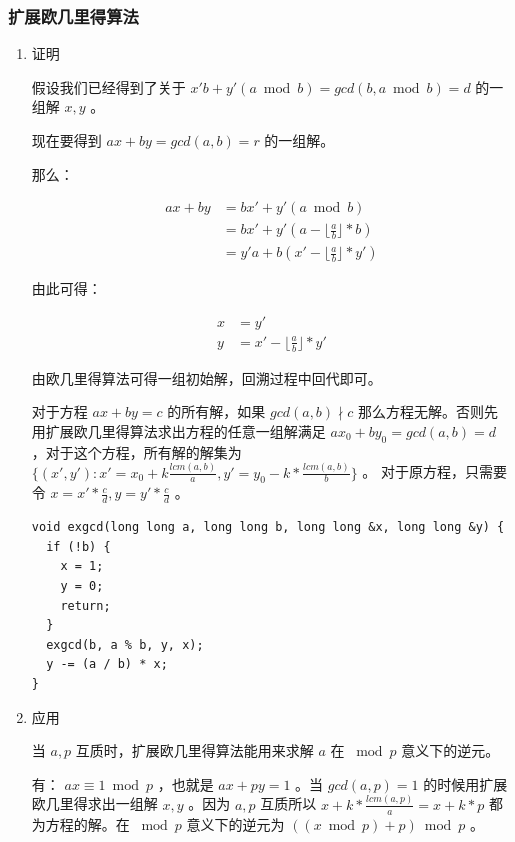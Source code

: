 \documentclass[11pt]{article}
\begin{document}
\subsubsection{扩展欧几里得算法}
\label{sec-3-1-4}
\begin{enumerate}
\item 证明
\label{sec-3-1-4-1}

假设我们已经得到了关于 $x'b+y'(a \bmod b)=gcd(b,a \bmod b)=d$ 的一组解 $x,y$ 。

现在要得到 $ax+by=gcd(a,b)=r$ 的一组解。

那么：

$$\begin{aligned}
a x + b y &= b x' + y' (a \bmod b)\\
&= bx' + y'(a - \lfloor \frac{a}{b} \rfloor * b) \\
&= y'a + b(x' - \lfloor \frac{a}{b} \rfloor*y')
\end{aligned}$$

由此可得：

$$\begin{aligned}
x &= y'\\
y &= x' - \lfloor \frac{a}{b} \rfloor * y'
\end{aligned}$$

由欧几里得算法可得一组初始解，回溯过程中回代即可。

对于方程 $ax+by=c$ 的所有解，如果 $gcd(a,b) \nmid c$ 那么方程无解。否则先用扩展欧几里得算法求出方程的任意一组解满足 $ax_0+by_0=gcd(a,b)=d$  ，对于这个方程，所有解的解集为 
$\{(x',y'): x' = x_0 + k \frac{lcm(a,b)}{a}, y'=y_0-k*\frac{lcm(a,b)}{b}\}$ 。 对于原方程，只需要令 $x=x'*\frac{c}{d},y=y'*\frac{c}{d}$ 。 

\begin{verbatim}
void exgcd(long long a, long long b, long long &x, long long &y) {
  if (!b) {
    x = 1;
    y = 0;
    return;
  }
  exgcd(b, a % b, y, x);
  y -= (a / b) * x;
}
\end{verbatim}

\item 应用
\label{sec-3-1-4-2}

当 $a, p$ 互质时，扩展欧几里得算法能用来求解 $a$ 在 $\bmod p$ 意义下的逆元。

有： $ax \equiv 1 \bmod p$  ，也就是 $ax + py = 1$  。当 $gcd(a,p)=1$ 的时候用扩展欧几里得求出一组解 $x,y$  。因为 $a,p$ 互质所以 $x+k* \frac{lcm(a,p)}{a} = x + k * p$ 都为方程的解。在 $\bmod p$ 意义下的逆元为 $((x \bmod p) + p) \bmod p$  。
\end{enumerate}
\end{document}
